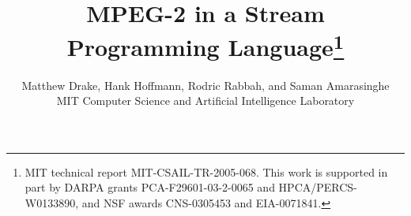 \documentclass[times,12pt,onecolumn]{article}
\title{MPEG-2 in a Stream Programming Language\footnote{
    MIT technical report MIT-CSAIL-TR-2005-068. This work is supported
    in part by DARPA grants PCA-F29601-03-2-0065 and
    HPCA/PERCS-W0133890, and NSF awards CNS-0305453 and EIA-0071841.}}
\author{
  Matthew Drake, Hank Hoffmann, Rodric Rabbah, and Saman Amarasinghe\\
  MIT Computer Science and Artificial Intelligence Laboratory
}
\date{}
\begin{document}
\maketitle
\thispagestyle{empty}

\begin{abstract}

\end{abstract}





%


%





\end{document}
